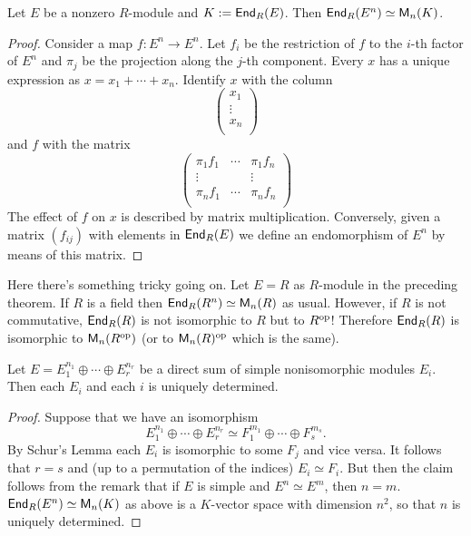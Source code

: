 \begin{thm}
Let $E$ be a nonzero $R$-module and $K:=\operatorname{\sf{End}}_R(E)$.
Then $\operatorname{\sf{End}}_R(E^n)\simeq \operatorname{\sf{M}}_n(K)$. 
\begin{proof}
Consider a map $f : E^n \to E^n$. Let $f_i$ be the restriction of $f$ to the $i$-th factor of $E^n$ and $\pi_j$ be the projection along the $j$-th component. 
Every $x$ has a unique expression as $x = x_1 +\cdots + x_n$. Identify $x$ with the column
$$\begin{pmatrix}
x_1 \\
\vdots \\
x_n \\
\end{pmatrix}$$
and $f$ with the matrix 
$$\begin{pmatrix}
\pi_1 f_1 & \cdots & \pi_1 f_n \\
\vdots  &  & \vdots  \\
\pi_n f_1 & \cdots & \pi_n f_n \\
\end{pmatrix}$$
The effect of $f$ on $x$ is described by matrix multiplication. Conversely, given a matrix $(f_{ij})$ with elements in $\operatorname{\sf{End}}_R(E)$ we define an endomorphism of $E^n$ by means of this matrix. 
\end{proof}
\end{thm}

Here there's something tricky going on. 
Let $E=R$ as $R$-module in the preceding theorem. 
If $R$ is a field then $\operatorname{\sf{End}}_R(R^n) \simeq \operatorname{\sf{M}}_n(R)$ as usual. 
However, if $R$ is not commutative, $\operatorname{\sf{End}}_R(R)$ is not isomorphic to $R$ but to $R^{\operatorname{op}}$! 
Therefore $\operatorname{\sf{End}}_R(R)$ is isomorphic to $\operatorname{\sf{M}}_n(R^{\operatorname{op}})$ (or to $\operatorname{\sf{M}}_n(R)^{\operatorname{op}}$ which is the same). 

\begin{thm} Let $E=E_{1} ^{n_1} \oplus \cdots \oplus E_{r} ^{n_r}$ be a direct sum of simple nonisomorphic modules $E_i$.
Then each $E_i$ and each $i$ is uniquely determined. 
\begin{proof} Suppose that we have an isomorphism 
$$E_{1} ^{n_1} \oplus \cdots \oplus E_{r} ^{n_r} \simeq F_{1} ^{m_1} \oplus \cdots \oplus F_{s} ^{m_s}\text{.}$$
By Schur's Lemma each $E_i$ is isomorphic to some $F_j$ and vice versa. 
It follows that $r=s$ and (up to a permutation of the indices) $E_i \simeq F_i$. 
But then the claim follows from the remark that if $E$ is simple and $E^n \simeq E^m$, then $n=m$.
$\operatorname{\sf{End}}_R(E^n)\simeq \operatorname{\sf{M}}_n(K) $ as above is a $K$-vector space with dimension $n^2$, so that $n$ is uniquely determined.
\end{proof}
\end{thm}

